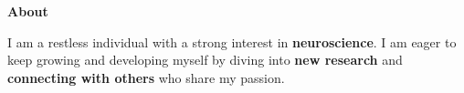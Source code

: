 \begin{tcolorbox}[vercelcard]
\textcolor{DockerBlue}{\large\textbf{About}}

\vspace{8pt}

I am a restless individual with a strong interest in \textbf{neuroscience}. I am eager to 
keep growing and developing myself by diving into \textbf{new research} and \textbf{connecting with others} 
who share my passion.

\end{tcolorbox}
